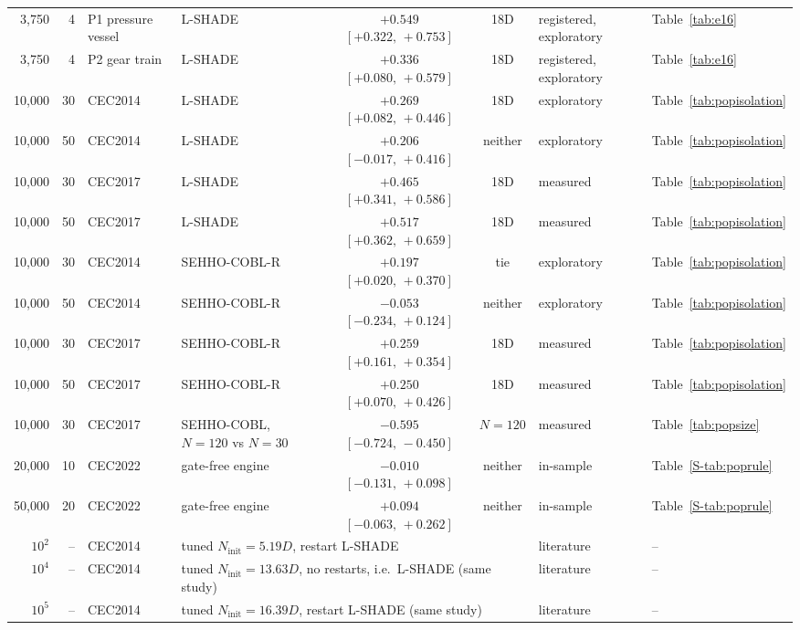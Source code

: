 \begin{table}[htbp]
{\begin{tabular}{rrllccll}
3{,}750 & 4 & P1 pressure vessel & L-SHADE & $+0.549$ $[+0.322,\,+0.753]$ & 18D & registered, exploratory & Table~\ref{tab:e16} \\
3{,}750 & 4 & P2 gear train & L-SHADE & $+0.336$ $[+0.080,\,+0.579]$ & 18D & registered, exploratory & Table~\ref{tab:e16} \\
10{,}000 & 30 & CEC2014 & L-SHADE & $+0.269$ $[+0.082,\,+0.446]$ & 18D & exploratory & Table~\ref{tab:popisolation} \\
10{,}000 & 50 & CEC2014 & L-SHADE & $+0.206$ $[-0.017,\,+0.416]$ & neither & exploratory & Table~\ref{tab:popisolation} \\
10{,}000 & 30 & CEC2017 & L-SHADE & $+0.465$ $[+0.341,\,+0.586]$ & 18D & measured & Table~\ref{tab:popisolation} \\
10{,}000 & 50 & CEC2017 & L-SHADE & $+0.517$ $[+0.362,\,+0.659]$ & 18D & measured & Table~\ref{tab:popisolation} \\
10{,}000 & 30 & CEC2014 & SEHHO-COBL-R & $+0.197$ $[+0.020,\,+0.370]$ & tie & exploratory & Table~\ref{tab:popisolation} \\
10{,}000 & 50 & CEC2014 & SEHHO-COBL-R & $-0.053$ $[-0.234,\,+0.124]$ & neither & exploratory & Table~\ref{tab:popisolation} \\
10{,}000 & 30 & CEC2017 & SEHHO-COBL-R & $+0.259$ $[+0.161,\,+0.354]$ & 18D & measured & Table~\ref{tab:popisolation} \\
10{,}000 & 50 & CEC2017 & SEHHO-COBL-R & $+0.250$ $[+0.070,\,+0.426]$ & 18D & measured & Table~\ref{tab:popisolation} \\
10{,}000 & 30 & CEC2017 & SEHHO-COBL, $N{=}120$ vs $N{=}30$ & $-0.595$ $[-0.724,\,-0.450]$ & $N{=}120$ & measured & Table~\ref{tab:popsize} \\
20{,}000 & 10 & CEC2022 & gate-free engine & $-0.010$ $[-0.131,\,+0.098]$ & neither & in-sample & Table~\ref{S-tab:poprule} \\
50{,}000 & 20 & CEC2022 & gate-free engine & $+0.094$ $[-0.063,\,+0.262]$ & neither & in-sample & Table~\ref{S-tab:poprule} \\
$10^2$ & -- & CEC2014 & \multicolumn{3}{l}{tuned $N_{\text{init}}=5.19D$, restart L-SHADE \citep{tanabe2015tuning}} & literature & -- \\
$10^4$ & -- & CEC2014 & \multicolumn{3}{l}{tuned $N_{\text{init}}=13.63D$, no restarts, i.e.\ L-SHADE (same study)} & literature & -- \\
$10^5$ & -- & CEC2014 & \multicolumn{3}{l}{tuned $N_{\text{init}}=16.39D$, restart L-SHADE (same study)} & literature & -- \\

\end{tabular}}
\end{table}

